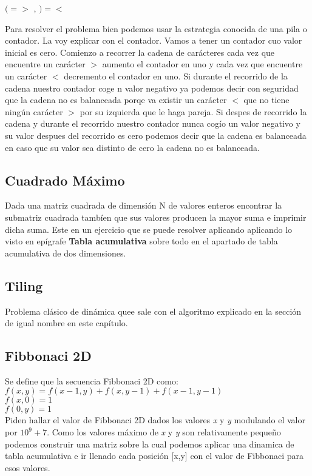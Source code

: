 $( = >$ , $) = <$

Para resolver el problema bien podemos usar la estrategia conocida de una pila o contador. La voy explicar con el contador. Vamos a tener un contador cuo valor inicial es cero. Comienzo a recorrer la cadena de carácteres cada vez que encuentre un carácter $>$ aumento el contador en uno y cada vez que encuentre un carácter $<$ decremento el contador en uno. Si durante el recorrido de la cadena nuestro contador coge n valor negativo ya podemos decir con seguridad que la cadena no es balanceada porqe va existir un carácter $<$ que no tiene ningún carácter $>$ por su izquierda que le haga pareja. Si despes de recorrido la cadena y durante el recorrido nuestro contador nunca cogío un valor negativo y su valor despues del recorrido es cero podemos decir que la cadena es balanceada en caso que su valor sea distinto de cero la cadena no es balanceada. 

\subsection{Cuadrado Máximo} Dada una matriz cuadrada de dimensión N de valores enteros encontrar la submatriz cuadrada tambíen que sus valores producen la mayor suma e imprimir dicha suma. Este en un ejercicio que se puede resolver aplicando aplicando lo visto en epígrafe \textbf{Tabla acumulativa} sobre todo en el apartado de tabla acumulativa de dos dimensiones. 

\subsection{Tiling} Problema clásico de dinámica quee sale con el algoritmo explicado en la sección de igual nombre en este capítulo.

\subsection{Fibbonaci 2D} Se define que la secuencia Fibbonaci 2D como:\\
$f(x,y)=f(x-1,y)+f(x,y-1)+f(x-1,y-1)$\\
$f(x,0)=1$\\
$f(0,y)=1$\\

Piden hallar el valor de Fibbonaci 2D  dados los valores \emph{x} y \emph{y} modulando el valor por $10^{9}+7$. Como los valores máximo de \emph{x} y \emph{y} son relativamente pequeño podemos construir una matriz sobre la cual podemos aplicar una dinamica de tabla acumulativa e ir llenado cada posición [x,y] con el valor de Fibbonaci para esos valores. 

